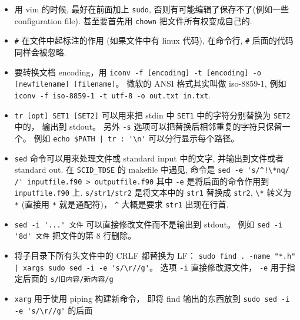 \begin{itemize}
\item 用 vim 的时候, 最好在前面加上 \verb`sudo`, 否则有可能编辑了保存不了(例如一些 configuration file). 甚至要首先用 \verb`chown` 把文件所有权变成自己的.
\item \verb`#` 在文件中起标注的作用 (如果文件中有 linux 代码), 在命令行, \verb`#` 后面的代码同样会被忽略.
\item 要转换文档 encoding，用 \verb|iconv -f [encoding] -t [encoding] -o [newfilename] [filename]|。 微软的 ANSI 格式其实叫做 iso-8859-1, 例如 \verb`iconv -f iso-8859-1 -t utf-8 -o out.txt in.txt`.
\item \verb|tr [opt] SET1 [SET2]| 可以用来把 stdin 中 \verb|SET1| 中的字符分别替换为 \verb|SET2| 中的， 输出到 stdout。 另外 \verb|-s| 选项可以把替换后相邻重复的字符只保留一个。 例如 \verb`echo $PATH | tr : '\n'` 可以分行显示每个路径。
\item \verb`sed` 命令可以用来处理文件或 standard input 中的文字, 并输出到文件或者 standard out. 在 \verb`SCID_TDSE` 的 makefile 中遇见, 命令是
\verb|sed -e 's/^!\*nq/    /' inputfile.f90 > outputfile.f90|
其中 \verb`-e` 是将后面的命令作用到 \verb`inputfile.f90` 上. \verb`s/str1/str2` 是将文本中的 \verb`str1` 替换成 \verb`str2`, \verb`\*` 转义为 \verb`*` (直接用 \verb`*` 就是通配符)， \verb`^` 大概是要求 \verb`str1` 出现在行首.
\item \verb|sed -i '...' 文件| 可以直接修改文件而不是输出到 stdout。 例如 \verb|sed -i '8d' 文件| 把文件的第 8 行删除。
\item 将子目录下所有头文件中的 CRLF 都替换为 LF： \verb`sudo find . -name "*.h" | xargs sudo sed -i -e 's/\r//g'`。 选项 \verb`-i` 直接修改源文件， \verb`-e` 用于指定后面的 \verb`s/旧内容/新内容/g`
\item \verb`xarg` 用于使用 piping 构建新命令， 即将 find 输出的东西放到 \verb`sudo sed -i -e 's/\r//g'` 的后面
\end{itemize}


